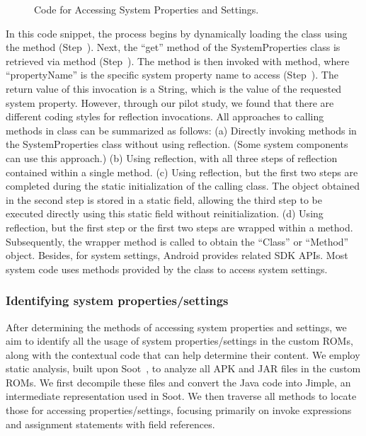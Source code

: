 \begin{figure}[h]
  \centering
  \caption{Code for Accessing System Properties and Settings.}
  \label{fig:code}
\end{figure}

In this code snippet, the process begins by dynamically loading the \texttt{} class using the \texttt{} method (Step~). 
Next, the ``get'' method of the SystemProperties class is retrieved via \texttt{} method (Step~). 
The method is then invoked with \texttt{} method, where ``propertyName'' is the specific system property name to access (Step~). 
The return value of this invocation is a String, which is the value of the requested system property.
However, through our pilot study, we found that there are different coding styles for reflection invocations.
All approaches to calling methods in \texttt{} class can be summarized as follows:
(a) Directly invoking methods in the SystemProperties class without using reflection. 
(Some system components can use this approach.)
(b) Using reflection, with all three steps of reflection contained within a single method.
(c) Using reflection, but the first two steps are completed during the static initialization of the calling class. 
The \texttt{} object obtained in the second step is stored in a static field, allowing the third step to be executed directly using this static field without reinitialization.
(d) Using reflection, but the first step or the first two steps are wrapped within a method. 
Subsequently, the wrapper method is called to obtain the ``Class'' or ``Method'' object.
Besides, for system settings, Android provides related SDK APIs. 
Most system code uses methods provided by the \texttt{} class to access system settings.


\subsubsection{Identifying system properties/settings}

After determining the methods of accessing system properties and settings, we aim to identify all the usage of system properties/settings in the custom ROMs, along with the contextual code that can help determine their content.
We employ static analysis, built upon Soot~\cite{vallee2010soot}, to analyze all APK and JAR files in the custom ROMs.
We first decompile these files and convert the Java code into Jimple, an intermediate representation used in Soot.
We then traverse all methods to locate those for accessing properties/settings, focusing primarily on invoke expressions and assignment statements with field references.

